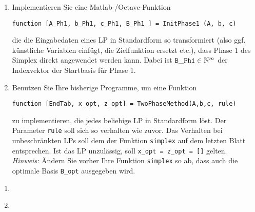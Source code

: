 \documentclass[11pt,german,a4paper,parskip=half-]{scrartcl}
\begin{document}
\lstset{basicstyle=\small\ttfamily,keywordstyle=\bfseries,frame=single,language=Matlab,numbers=left}
\begin{exercise}{4}
\begin{enumerate}
 \item 
Implementieren Sie eine Matlab-/Octave-Funktion
\begin{center}\lstinline!function [A_Ph1, b_Ph1, c_Ph1, B_Ph1 ] = InitPhase1 (A, b, c)!\end{center}
die die Eingabedaten eines LP in Standardform so transformiert (also ggf. künstliche Variablen einfügt, die Zielfunktion ersetzt etc.), dass Phase 1 des Simplex direkt angewendet werden kann. Dabei ist ${\tt B\_Ph1} \in \mathbb{N}^m$  der Indexvektor der Startbasis
für Phase 1.
\item Benutzen Sie Ihre bisherige Programme, um eine Funktion
\begin{center}\lstinline!function [EndTab, x_opt, z_opt] = TwoPhaseMethod(A,b,c, rule)!\end{center}
zu implementieren, die jedes beliebige LP in Standardform löst. Der Parameter \lstinline!rule! soll sich so verhalten wie zuvor. Das Verhalten bei unbeschränkten LPs soll dem der Funktion
\lstinline!simplex! auf dem letzten Blatt entsprechen. Ist das LP unzulässig, soll \lstinline!x_opt = z_opt = []! gelten.\\
{\it Hinweis:} Ändern Sie vorher Ihre Funktion \lstinline!simplex! so ab, dass auch die optimale Basis \lstinline!B_opt! ausgegeben wird.
\end{enumerate}

\end{exercise}

\begin{solution}
\lstset{basicstyle=\tiny\ttfamily}
 \begin{enumerate}
  \item~\hfill 
  \item~\hfill 
 \end{enumerate}

\end{solution}
\end{document}
